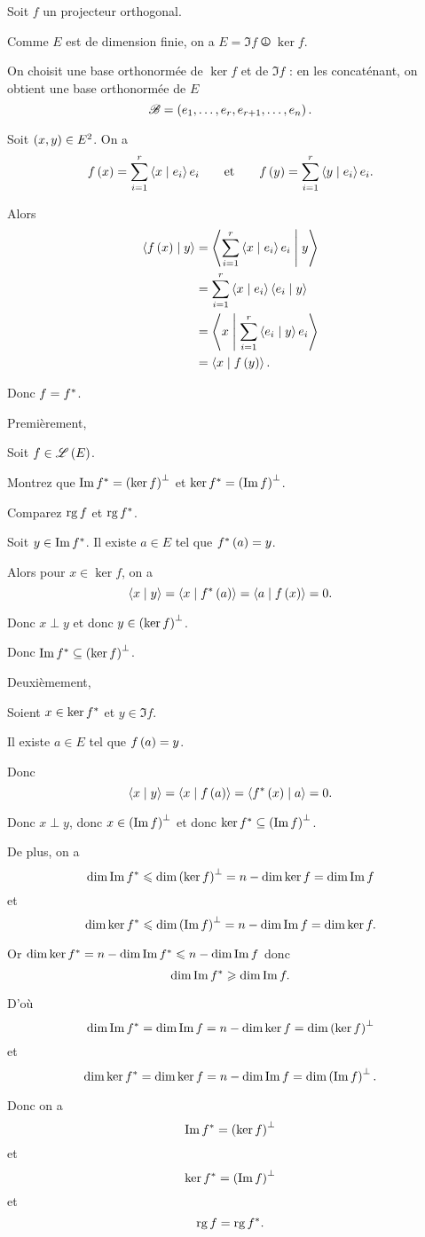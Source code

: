 \begin{corr}
Soit \(f\) un projecteur orthogonal.

Comme \(E\) est de dimension finie, on a \(E=\Im f\operp\ker f\).

On choisit une base orthonormée de \(\ker f\) et de \(\Im f\) : en les concaténant, on obtient une base orthonormée de \(E\) \[\mathscr{B}=\left(e_1,\dots,e_r,e_{r+1},\dots,e_n\right).\]

Soit \(\left(x,y\right)\in E^2\). On a \[f\paren{x}=\sum_{i=1}^r\ps{x}{e_i}e_i\qquad\text{et}\qquad f\paren{y}=\sum_{i=1}^r\ps{y}{e_i}e_i.\]

Alors \[\begin{aligned}
\ps{f\paren{x}}{y}&=\ps{\sum_{i=1}^r\ps{x}{e_i}e_i}{y} \\
&=\sum_{i=1}^r\ps{x}{e_i}\ps{e_i}{y} \\
&=\ps{x}{\sum_{i=1}^r\ps{e_i}{y}e_i} \\
&=\ps{x}{f\paren{y}}.
\end{aligned}\]

Donc \(f=f^*\).
\end{corr}

\begin{exo}
Premièrement,

Soit \(f\in\mathscr{L}\left(E\right)\).

Montrez que \(\operatorname{Im} f^*=\left(\ker f\right)^{\perp}\) et \(\ker f^*=\left(\operatorname{Im} f\right)^{\perp}\).

Comparez \(\operatorname{rg} f\) et \(\operatorname{rg} f^*\).
\end{exo}

\begin{corr}
Soit \(y\in\operatorname{Im} f^*\). Il existe \(a\in E\) tel que \(f^*\left(a\right)=y\).

Alors pour \(x\in\ker f\), on a \[\ps{x}{y}=\ps{x}{f\adj\paren{a}}=\ps{a}{f\paren{x}}=0.\]

Donc \(x\perp y\) et donc \(y\in\left(\ker f\right)^{\perp}\).

Donc \(\operatorname{Im} f^*\subseteq\left(\ker f\right)^{\perp}\).

Deuxièmement,

Soient \(x\in\ker f^*\) et \(y\in\Im f\).

Il existe \(a\in E\) tel que \(f\left(a\right)=y\).

Donc \[\ps{x}{y}=\ps{x}{f\paren{a}}=\ps{f\adj\paren{x}}{a}=0.\]

Donc \(x\perp y\), donc \(x\in\left(\operatorname{Im} f\right)^{\perp}\) et donc \(\ker f^*\subseteq\left(\operatorname{Im} f\right)^{\perp}\).

De plus, on a \[\dim\operatorname{Im} f^*\leqslant\dim\left(\ker f\right)^{\perp}=n-\dim\ker f=\dim\operatorname{Im} f\] et \[\dim\ker f^*\leqslant\dim\left(\operatorname{Im} f\right)^{\perp}=n-\dim\operatorname{Im} f=\dim\ker f.\]

Or \(\dim\ker f^*=n-\dim\operatorname{Im} f^*\leqslant n-\dim\operatorname{Im} f\) donc \[\dim\operatorname{Im} f^*\geqslant\dim\operatorname{Im} f.\]

D'où \[\dim\operatorname{Im} f^*=\dim\operatorname{Im} f=n-\dim\ker f=\dim\left(\ker f\right)^{\perp}\] et \[\dim\ker f^*=\dim\ker f=n-\dim\operatorname{Im} f=\dim\left(\operatorname{Im} f\right)^{\perp}.\]

Donc on a \[\operatorname{Im} f^*=\left(\ker f\right)^{\perp}\] et \[\ker f^*=\left(\operatorname{Im} f\right)^{\perp}\] et \[\operatorname{rg} f=\operatorname{rg} f^*.\]
\end{corr}

